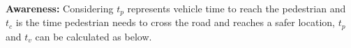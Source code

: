 








\newpara
\textbf{Awareness:}
Considering ${t_p}$ represents vehicle time to reach the pedestrian and \\
${t_c}$ is the time pedestrian needs to cross the road and reaches a safer location,
${t_p}$ and ${t_v}$  can be calculated as below.

